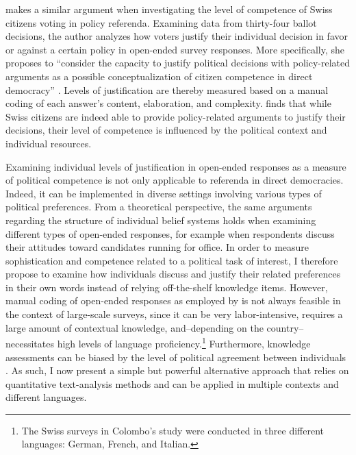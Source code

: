 \documentclass[12pt]{article}
\begin{document}
\citet{colombo2016justifications} makes a similar argument when investigating the level of competence of Swiss citizens voting in policy referenda. Examining data from thirty-four ballot decisions, the author analyzes how voters justify their individual decision in favor or against a certain policy in open-ended survey responses. More specifically, she proposes to ``consider the capacity to justify political decisions with policy-related arguments as a possible conceptualization of citizen competence in direct democracy'' \citep[3]{colombo2016justifications}. Levels of justification are thereby measured based on a manual coding of each answer's content, elaboration, and complexity. \citet{colombo2016justifications} finds that while Swiss citizens are indeed able to provide policy-related arguments to justify their decisions, their level of competence is influenced by the political context and individual resources.

Examining individual levels of justification in open-ended responses as a measure of political competence is not only applicable to referenda in direct democracies. Indeed, it can be implemented in diverse settings involving various types of political preferences. From a theoretical perspective, the same arguments regarding the structure of individual belief systems holds when examining different types of open-ended responses, for example when respondents discuss their attitudes toward candidates running for office. In order to measure sophistication and competence related to a political task of interest, I therefore propose to examine how individuals discuss and justify their related preferences in their own words instead of relying off-the-shelf knowledge items. However, manual coding of open-ended responses as employed by \citet{colombo2016justifications} is not always feasible in the context of large-scale surveys, since it can be very labor-intensive, requires a large amount of contextual knowledge, and--depending on the country--necessitates high levels of language proficiency.\footnote{The Swiss surveys in Colombo's \citeyearpar{colombo2016justifications} study were conducted in three different languages: German, French, and Italian.} Furthermore, knowledge assessments can be biased by the level of political agreement between individuals \citep{ryan2011accuracy}. As such, I now present a simple but powerful alternative approach that relies on quantitative text-analysis methods and can be applied in multiple contexts and different languages.


\end{document}
